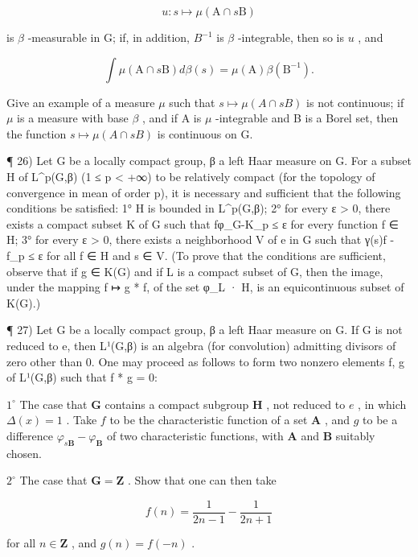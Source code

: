 \[
u: s \mapsto \mu (\mathrm{A} \cap s \mathrm{B})
\]

is \(\beta\) -measurable in G; if, in addition, \(B^{-1}\) is \(\beta\) -integrable, then so is \(u\) , and

\[
\int \mu (\mathrm{A} \cap s \mathrm{B}) d \beta (s) = \mu (\mathrm{A}) \beta (\mathrm{B} ^ {- 1}).
\]

Give an example of a measure \(\mu\) such that \(s \mapsto \mu(A \cap sB)\) is not continuous; if \(\mu\) is a measure with base \(\beta\) , and if A is \(\mu\) -integrable and B is a Borel set, then the function \(s \mapsto \mu(A \cap sB)\) is continuous on G.

¶ 26) Let G be a locally compact group, β a left Haar measure on G. For a subset H of L\^{}p(G,β) (1 ≤ p \textless{} +∞) to be relatively compact (for the topology of convergence in mean of order p), it is necessary and sufficient that the following conditions be satisfied: 1° H is bounded in L\^{}p(G,β); 2° for every ε \textgreater{} 0, there exists a compact subset K of G such that \textbar\textbar fφ\_G-K\textbar\textbar\_p ≤ ε for every function f ∈ H; 3° for every ε \textgreater{} 0, there exists a neighborhood V of e in G such that \textbar\textbar γ(s)f - f\textbar\textbar\_p ≤ ε for all f ∈ H and s ∈ V. (To prove that the conditions are sufficient, observe that if g ∈ K(G) and if L is a compact subset of G, then the image, under the mapping f ↦ g * f, of the set φ\_L · H, is an equicontinuous subset of K(G).)

¶ 27) Let G be a locally compact group, β a left Haar measure on G. If G is not reduced to e, then L¹(G,β) is an algebra (for convolution) admitting divisors of zero other than 0. One may proceed as follows to form two nonzero elements f, g of L¹(G,β) such that f * g = 0:

\(1^{\circ}\) The case that \(\mathbf{G}\) contains a compact subgroup \(\mathbf{H}\) , not reduced to \(e\) , in which \(\Delta(x)=1\) . Take \(f\) to be the characteristic function of a set \(\mathbf{A}\) , and \(g\) to be a difference \(\varphi_{s\mathbf{B}}-\varphi_{\mathbf{B}}\) of two characteristic functions, with \(\mathbf{A}\) and \(\mathbf{B}\) suitably chosen.

\(2^{\circ}\) The case that \(\mathbf{G} = \mathbf{Z}\) . Show that one can then take

\[
f (n) = \frac {1}{2 n - 1} - \frac {1}{2 n + 1}
\]

for all \(n \in \mathbf{Z}\) , and \(g(n) = f(-n)\) .

